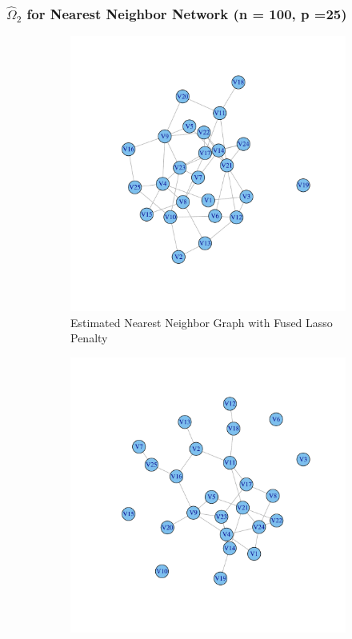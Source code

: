 \documentclass[t]{beamer}
\begin{document}
\begin{frame}
\frametitle{$\hat{\Omega}_2$ for Nearest Neighbor Network (n = 100, p =25)}
\begin{figure}
\centering 
\begin{subfigure}[b]{0.40\textwidth}
  \includegraphics[scale=0.15]{Omega2hat-f.pdf}
  \caption{Estimated Nearest Neighbor Graph with Fused Lasso Penalty}
\label{fig:nearestgaphsestimate}
\end{subfigure}
\begin{subfigure}[b]{0.40\textwidth}
  \includegraphics[scale=0.15]{Omega2hat-g.pdf}

\end{subfigure}
\end{figure}
\end{frame}
\end{document}
